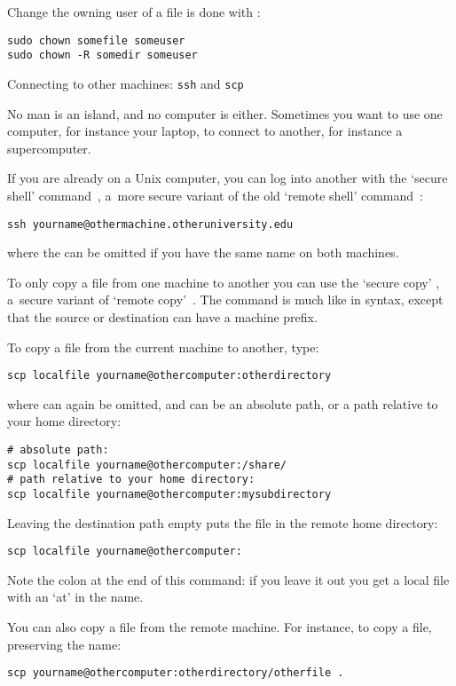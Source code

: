 Change the owning user of a file is done with :
\begin{lstlisting}
sudo chown somefile someuser
sudo chown -R somedir someuser
\end{lstlisting}

 {Connecting to other machines: {\tt ssh} and {\tt scp}}

No man is an island, and no computer is either. Sometimes you want to
use one computer, for instance your laptop, to connect to another, for
instance a supercomputer.

If you are already on a Unix computer, you can log into another with
the `secure shell' command~, a~more secure variant
of the old `remote shell' command~:
\begin{lstlisting}
ssh yourname@othermachine.otheruniversity.edu
\end{lstlisting}
where the  can be omitted if you have the same name on
both machines.

To only copy a file from one machine to another you can use the
`secure copy' , a~secure variant of `remote
copy'~. The  command is much like  in syntax,
except that the source or destination can have a machine prefix.

To copy a file from the current machine to
another, type:
\begin{lstlisting}
scp localfile yourname@othercomputer:otherdirectory
\end{lstlisting}
where  can again be omitted, and  can be
an absolute path, or a path relative to your home directory:
\begin{lstlisting}
# absolute path:
scp localfile yourname@othercomputer:/share/
# path relative to your home directory:
scp localfile yourname@othercomputer:mysubdirectory
\end{lstlisting}
Leaving the destination path empty puts the file in the remote home directory:
\begin{lstlisting}
scp localfile yourname@othercomputer:
\end{lstlisting}
Note the colon at the end of this command: if you leave it out you get
a local file with an `at' in the name.

You can also copy a file from the remote machine. For instance, to
copy a file, preserving the name:
\begin{lstlisting}
scp yourname@othercomputer:otherdirectory/otherfile .
\end{lstlisting}

